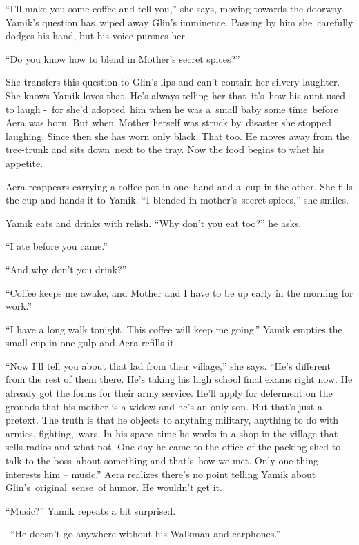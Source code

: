 \documentclass[twoside,11pt]{book}
\begin{document}
{}``I'll make you some coffee and tell you,{}'' she says, moving towards the doorway. Yamik's question has~wiped away
Glin's {imminence}. Passing by him she\ carefully dodges his hand, but his voice pursues her.\ 

{}``Do you know how to blend in Mother's secret spices?'' 

She transfers this question to Glin's lips and can't contain her silvery laughter. She knows Yamik loves that. He{}'s
always telling her that\ it's\ how his aunt used to laugh -\  for she{}'d adopted\ him when he was a\ small baby some
time\ before Aera was born. But when\ Mother herself was struck by\ disaster she stopped laughing. Since then she has
worn only black. That too. He moves away from the tree-trunk and sits down\ next to the tray. Now the food begins to
whet his appetite.\ 

Aera reappears carrying a coffee pot in one~hand and a~cup in the other. She fills the cup and hands it to Yamik. ``I
blended in mother's~secret spices,'' she smiles.~ 

Yamik eats and drinks with relish. ``Why don't you eat too?'' he asks. 

{}``I ate before you came.'' 

{}``And why don't you drink?'' 

{}``Coffee keeps me awake, and Mother and I have to be up early in the morning for work.'' 

{}``I have a long walk tonight. This coffee will keep me going.'' Yamik empties the small cup in one gulp and Aera
refills it. 

{}``Now I'll tell you about that lad from their village,'' she says. {}``He's different from the rest of them there.
He{}'s taking his high school final exams right now. He already got the forms for their army service. He'll apply for
deferment on the grounds that his mother is a widow and he's an only son. But that's just a pretext. The truth is that
he objects to anything military, anything to do with armies, fighting,~wars. In his spare\ time he works in a shop in
the village that sells radios and what not. One day he came to the office of the packing shed to talk to the
boss\ about something and that's~how we met. Only one thing interests him -- music.'' Aera realizes there's no point
telling Yamik about Glin's\ original{\ }sense\ of humor. He wouldn't get it. 

{}``Music?'' Yamik repeats a bit surprised.

~``He doesn't go anywhere without his Walkman and earphones.'' 
\end{document}
